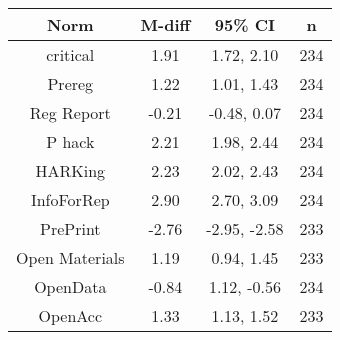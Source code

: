 \documentclass[
]{article}
\begin{document}
\begin{longtable}[]{@{}cccc@{}}
\toprule
Norm & M-diff & 95\% CI & n\tabularnewline
\midrule
\endhead
critical & 1.91 & 1.72, 2.10 & 234\tabularnewline
Prereg & 1.22 & 1.01, 1.43 & 234\tabularnewline
Reg Report & -0.21 & -0.48, 0.07 & 234\tabularnewline
P hack & 2.21 & 1.98, 2.44 & 234\tabularnewline
HARKing & 2.23 & 2.02, 2.43 & 234\tabularnewline
InfoForRep & 2.90 & 2.70, 3.09 & 234\tabularnewline
PrePrint & -2.76 & -2.95, -2.58 & 233\tabularnewline
Open Materials & 1.19 & 0.94, 1.45 & 233\tabularnewline
OpenData & -0.84 & 1.12, -0.56 & 234\tabularnewline
OpenAcc & 1.33 & 1.13, 1.52 & 233\tabularnewline
\bottomrule
\end{longtable}
\end{document}
